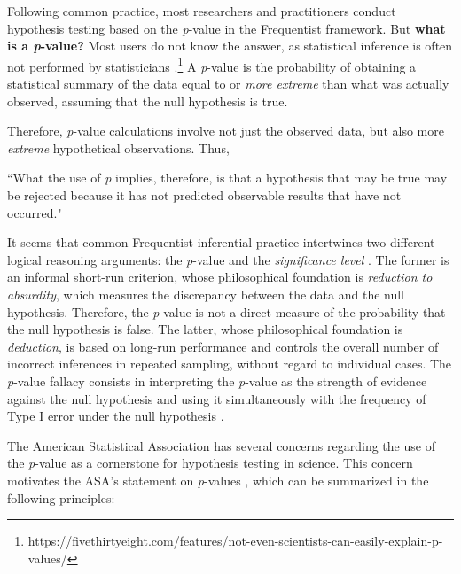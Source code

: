Following common practice, most researchers and practitioners conduct hypothesis testing based on the \textit{p}-value in the Frequentist framework. But \textbf{what is a \textit{p}-value?} Most users do not know the answer, as statistical inference is often not performed by statisticians \cite{Berger2006}.\footnote{https://fivethirtyeight.com/features/not-even-scientists-can-easily-explain-p-values/} A \textit{p}-value is the probability of obtaining a statistical summary of the data equal to or \textit{more extreme} than what was actually observed, assuming that the null hypothesis is true.

Therefore, \textit{p}-value calculations involve not just the observed data, but also more \textit{extreme} hypothetical observations. Thus,

``What the use of \textit{p} implies, therefore, is that a hypothesis that may be true may be rejected because it has not predicted observable results that have not occurred." \cite{Jeffreys1961}

It seems that common Frequentist inferential practice intertwines two different logical reasoning arguments: the \textit{p}-value \cite{Fisher1958} and the \textit{significance level} \cite{Neyman1933}. The former is an informal short-run criterion, whose philosophical foundation is \textit{reduction to absurdity}, which measures the discrepancy between the data and the null hypothesis. Therefore, the \textit{p}-value is not a direct measure of the probability that the null hypothesis is false. The latter, whose philosophical foundation is \textit{deduction}, is based on long-run performance and controls the overall number of incorrect inferences in repeated sampling, without regard to individual cases. The \textit{p}-value fallacy consists in interpreting the \textit{p}-value as the strength of evidence against the null hypothesis and using it simultaneously with the frequency of Type I error under the null hypothesis \cite{Goodman1999}.

The American Statistical Association has several concerns regarding the use of the \textit{p}-value as a cornerstone for hypothesis testing in science. This concern motivates the ASA's statement on \textit{p}-values \cite{Wasserstein2016}, which can be summarized in the following principles:

